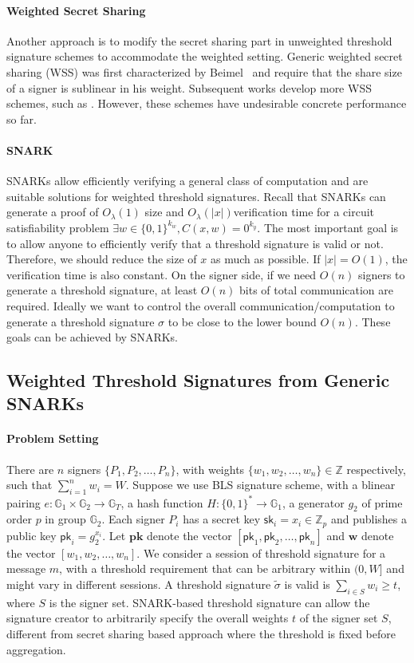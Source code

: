 \paragraph{Weighted Secret Sharing} Another approach is to modify the secret sharing part in unweighted threshold signature schemes to accommodate the weighted setting. Generic weighted secret sharing (WSS) was first characterized by Beimel~\cite{DBLP:conf/tcc/BeimelTW05} and require that the share size of a signer is sublinear in his weight. Subsequent works develop more WSS schemes, such as \cite{DBLP:conf/crypto/GargJMSWZ23}. However, these schemes have undesirable concrete performance so far. 

\paragraph{SNARK} SNARKs allow efficiently verifying a general class of computation and are suitable solutions for weighted threshold signatures. Recall that SNARKs can generate a proof of $O_\lambda(1)$ size and $O_\lambda(|x|)$verification time for a circuit satisfiability problem $\exists w\in\{0,1\}^{k_w}, C(x, w)=0^{k_y}$. The most important goal is to allow anyone to efficiently verify that a threshold signature is valid or not. Therefore, we should reduce the size of $x$ as much as possible. If $|x| = O(1)$, the verification time is also constant. On the signer side, if we need $O(n)$ signers to generate a threshold signature, at least $O(n)$ bits of total communication are required. Ideally we want to control the overall communication/computation to generate a threshold signature $\sigma$ to be close to the lower bound $O(n)$. These goals can be achieved by SNARKs. 

\subsection{Weighted Threshold Signatures from Generic SNARKs}
\paragraph{Problem Setting} There are $n$ signers $\{P_1, P_2, \dots, P_n\}$, with weights $\{w_1,w_2,\dots, w_n\}\in \mathbb{Z}$ respectively, such that $\sum_{i=1}^n w_i = W$. Suppose we use BLS signature scheme, with a blinear pairing $e:\mathbb{G}_1\times \mathbb{G}_2\to \mathbb{G}_T$, a hash function $H:\{0,1\}^\ast\to \mathbb{G}_1$, a generator $g_2$ of prime order $p$ in group $\mathbb{G}_2$. Each signer $P_i$ has a secret key $\mathsf{sk}_i = x_i \in \mathbb{Z}_p$ and publishes a public key $\mathsf{pk}_i = g_2^{x_i}$. Let $\mathbf{pk}$ denote the vector $[\mathsf{pk}_1,\mathsf{pk}_2,\dots, \mathsf{pk}_n]$ and $\mathbf{w}$ denote the vector $[w_1,w_2,\dots, w_n]$. We consider a session of threshold signature for a message $m$, with a threshold requirement that can be arbitrary within $(0, W]$ and might vary in different sessions. A threshold signature $\tilde{\sigma}$ is valid is $\sum_{i\in S}w_i\ge t$, where $S$ is the signer set. SNARK-based threshold signature can allow the signature creator to arbitrarily specify the overall weights $t$ of the signer set $S$, different from secret sharing based approach where the threshold is fixed before aggregation. 

